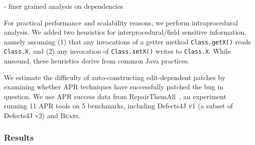 \documentclass[10pt,journal,compsoc]{IEEEtran}
\newcommand\bears{\textsc{Bears}\xspace}
\begin{document}
- finer grained analysis on dependencies

For practical performance and scalability reasons, 
we perform intraprocedural analysis. We added two heuristics for
interprocedural/field sensitive
information, namely assuming (1) that any invocations of a getter
method  \texttt{Class.getX()} reads \texttt{Class.X}, and (2) any invocation of 
 \texttt{Class.setX()} writes to  \texttt{Class.X}.
%
While unsound, these heuristics derive from common Java
practices.

We estimate the difficulty of auto-constructing edit-dependent patches 
by examining whether APR techniques have successfully patched the
bug in question. We use APR success data from 
RepairThemAll~\cite{durieux-repair-them-all}, an experiment 
running 11 APR tools on 5 benchmarks, including Defects4J v1
(a subset of Defects4J v2) and \bears.

\subsubsection{Results}
\end{document}
